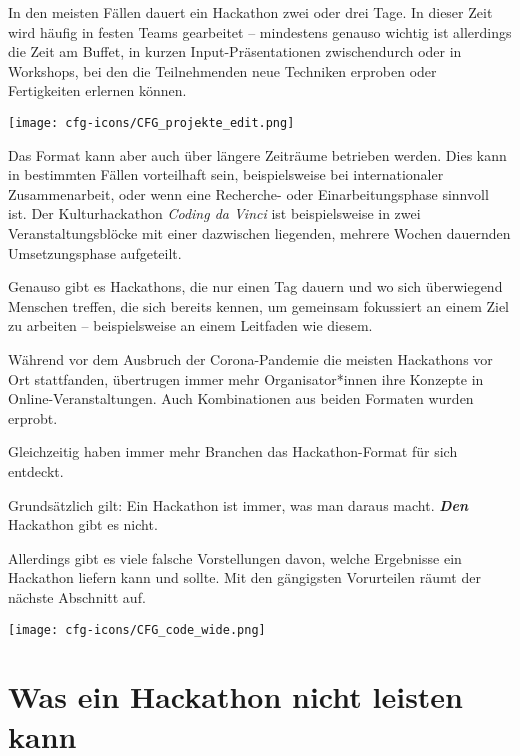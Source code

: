 In den meisten Fällen dauert ein Hackathon zwei oder drei Tage. In dieser Zeit wird häufig in festen Teams gearbeitet – mindestens genauso wichtig ist allerdings die Zeit am Buffet, in kurzen Input-Präsentationen zwischendurch oder in Workshops, bei den die Teilnehmenden neue Techniken erproben oder Fertigkeiten erlernen können.

\begin{marginfigure}[-0.5cm]
	\texttt{[image: cfg-icons/CFG\_projekte\_edit.png]}
\end{marginfigure}

Das Format kann aber auch über längere Zeiträume betrieben werden. Dies kann in bestimmten Fällen vorteilhaft sein, beispielsweise bei internationaler Zusammenarbeit, oder wenn eine Recherche- oder Einarbeitungsphase sinnvoll ist. Der Kulturhackathon \textit{Coding da Vinci} ist beispielsweise in zwei Veranstaltungsblöcke mit einer dazwischen liegenden, mehrere Wochen dauernden Umsetzungsphase aufgeteilt.

Genauso gibt es Hackathons, die nur einen Tag dauern und wo sich überwiegend Menschen treffen, die sich bereits kennen, um gemeinsam fokussiert an einem Ziel zu arbeiten – beispielsweise an einem Leitfaden wie diesem.

Während vor dem Ausbruch der Corona-Pandemie die meisten Hackathons vor Ort stattfanden, übertrugen immer mehr Organisator*innen ihre Konzepte in Online-Veranstaltungen. Auch Kombinationen aus beiden Formaten wurden erprobt.

Gleichzeitig haben immer mehr Branchen das Hackathon-Format für sich entdeckt.




\begin{kaobox}
	Grundsätzlich gilt: Ein Hackathon ist immer, was man daraus macht. \textit{\textbf{Den}} Hackathon gibt es nicht.
\end{kaobox}

Allerdings gibt es viele falsche Vorstellungen davon, welche Ergebnisse ein Hackathon liefern kann und sollte. Mit den gängigsten Vorurteilen räumt der nächste Abschnitt auf.

\vspace{8cm}
\begin{figure*}[h!]
	\texttt{[image: cfg-icons/CFG\_code\_wide.png]}
\end{figure*}

\chapter{Was ein Hackathon nicht leisten kann}

